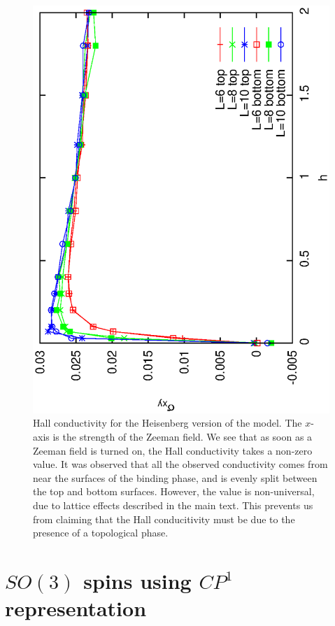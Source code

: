 \documentclass[prb,twocolumn]{revtex4}
\begin{document}
\begin{figure}
\includegraphics[angle=-90,width=0.9\linewidth]{figures/heishall.eps}
\caption{Hall conductivity for the Heisenberg version of the model. The $x$-axis is the strength of the Zeeman field. We see that as soon as a Zeeman field is turned on, the Hall conductivity takes a non-zero value. It was observed that all the observed conductivity comes from near the surfaces of the binding phase, and is evenly split between the top and bottom surfaces. However, the value is non-universal, due to lattice effects described in the main text. This prevents us from claiming that the Hall conducitivity must be due to the presence of a topological phase.}
\label{heishall}
\end{figure}

\section{$SO(3)$ spins using $CP^1$ representation}
\label{section::CP1}
\end{document}
